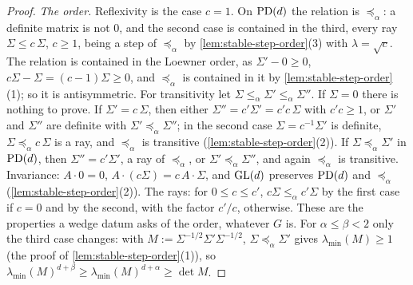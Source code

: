 \begin{proof}
\leanok
\emph{The order.} Reflexivity is the case $c = 1$. On $\mathrm{PD}(d)$ the relation is $\preceq_\alpha$: a
definite matrix is not $0$, and the second case is contained in the third, every ray $\Sigma \le
c\,\Sigma$, $c \ge 1$, being a step of $\preceq_\alpha$ by \ref{lem:stable-step-order}(3) with
$\lambda = \sqrt c$. The relation is contained in the Loewner order, as $\Sigma' - 0 \ge 0$,
$c\Sigma - \Sigma = (c-1)\Sigma \ge 0$, and $\preceq_\alpha$ is contained in it by
\ref{lem:stable-step-order}(1); so it is antisymmetric. For transitivity let
$\Sigma \le_\alpha \Sigma' \le_\alpha \Sigma''$. If $\Sigma = 0$ there is nothing to prove. If
$\Sigma' = c\,\Sigma$, then either $\Sigma'' = c'\Sigma' = c'c\,\Sigma$ with $c'c \ge 1$, or $\Sigma'$ and
$\Sigma''$ are definite with $\Sigma' \preceq_\alpha \Sigma''$; in the second case $\Sigma = c^{-1}\Sigma'$ is
definite, $\Sigma \preceq_\alpha c\,\Sigma$ is a ray, and $\preceq_\alpha$ is transitive
(\ref{lem:stable-step-order}(2)). If $\Sigma \preceq_\alpha \Sigma'$ in $\mathrm{PD}(d)$, then $\Sigma'' = c'\Sigma'$,
a ray of $\preceq_\alpha$, or $\Sigma' \preceq_\alpha \Sigma''$, and again $\preceq_\alpha$ is transitive.
Invariance: $A\cdot 0 = 0$, $A\cdot(c\Sigma) = c\,A\cdot\Sigma$, and $\mathrm{GL}(d)$ preserves $\mathrm{PD}(d)$ and
$\preceq_\alpha$ (\ref{lem:stable-step-order}(2)). The rays: for $0 \le c \le c'$, $c\Sigma \le_\alpha c'\Sigma$
by the first case if $c = 0$ and by the second, with the factor $c'/c$, otherwise. These are the
properties a wedge datum asks of the order, whatever $G$ is. For $\alpha \le \beta < 2$ only the third
case changes: with $M := \Sigma^{-1/2}\Sigma'\Sigma^{-1/2}$, $\Sigma \preceq_\alpha \Sigma'$ gives
$\lambda_{\min}(M) \ge 1$ (the proof of \ref{lem:stable-step-order}(1)), so
$\lambda_{\min}(M)^{d+\beta} \ge \lambda_{\min}(M)^{d+\alpha} \ge \det M$.


\end{proof}
